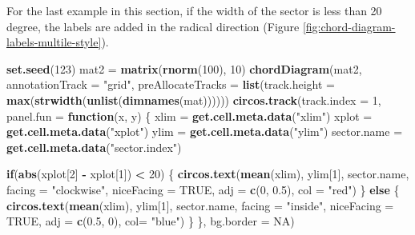 \documentclass[]{book}
\newenvironment{Shaded}{\begin{snugshade}}{\end{snugshade}}
\newcommand{\KeywordTok}[1]{\textcolor[rgb]{0.13,0.29,0.53}{\textbf{#1}}}
\newcommand{\DataTypeTok}[1]{\textcolor[rgb]{0.13,0.29,0.53}{#1}}
\newcommand{\DecValTok}[1]{\textcolor[rgb]{0.00,0.00,0.81}{#1}}
\newcommand{\FloatTok}[1]{\textcolor[rgb]{0.00,0.00,0.81}{#1}}
\newcommand{\StringTok}[1]{\textcolor[rgb]{0.31,0.60,0.02}{#1}}
\newcommand{\OtherTok}[1]{\textcolor[rgb]{0.56,0.35,0.01}{#1}}
\newcommand{\ControlFlowTok}[1]{\textcolor[rgb]{0.13,0.29,0.53}{\textbf{#1}}}
\newcommand{\OperatorTok}[1]{\textcolor[rgb]{0.81,0.36,0.00}{\textbf{#1}}}
\newcommand{\NormalTok}[1]{#1}
\theoremstyle{definition}
\theoremstyle{definition}
\theoremstyle{remark}
\begin{document}
For the last example in this section, if the width of the sector is less
than 20 degree, the labels are added in the radical direction (Figure
\ref{fig:chord-diagram-labels-multile-style}).

\begin{Shaded}
\begin{Highlighting}[]
\KeywordTok{set.seed}\NormalTok{(}\DecValTok{123}\NormalTok{)}
\NormalTok{mat2 =}\StringTok{ }\KeywordTok{matrix}\NormalTok{(}\KeywordTok{rnorm}\NormalTok{(}\DecValTok{100}\NormalTok{), }\DecValTok{10}\NormalTok{)}
\KeywordTok{chordDiagram}\NormalTok{(mat2, }\DataTypeTok{annotationTrack =} \StringTok{"grid"}\NormalTok{, }
    \DataTypeTok{preAllocateTracks =} \KeywordTok{list}\NormalTok{(}\DataTypeTok{track.height =} \KeywordTok{max}\NormalTok{(}\KeywordTok{strwidth}\NormalTok{(}\KeywordTok{unlist}\NormalTok{(}\KeywordTok{dimnames}\NormalTok{(mat))))))}
\KeywordTok{circos.track}\NormalTok{(}\DataTypeTok{track.index =} \DecValTok{1}\NormalTok{, }\DataTypeTok{panel.fun =} \ControlFlowTok{function}\NormalTok{(x, y) \{}
\NormalTok{    xlim =}\StringTok{ }\KeywordTok{get.cell.meta.data}\NormalTok{(}\StringTok{"xlim"}\NormalTok{)}
\NormalTok{    xplot =}\StringTok{ }\KeywordTok{get.cell.meta.data}\NormalTok{(}\StringTok{"xplot"}\NormalTok{)}
\NormalTok{    ylim =}\StringTok{ }\KeywordTok{get.cell.meta.data}\NormalTok{(}\StringTok{"ylim"}\NormalTok{)}
\NormalTok{    sector.name =}\StringTok{ }\KeywordTok{get.cell.meta.data}\NormalTok{(}\StringTok{"sector.index"}\NormalTok{)}

    \ControlFlowTok{if}\NormalTok{(}\KeywordTok{abs}\NormalTok{(xplot[}\DecValTok{2}\NormalTok{] }\OperatorTok{-}\StringTok{ }\NormalTok{xplot[}\DecValTok{1}\NormalTok{]) }\OperatorTok{<}\StringTok{ }\DecValTok{20}\NormalTok{) \{}
        \KeywordTok{circos.text}\NormalTok{(}\KeywordTok{mean}\NormalTok{(xlim), ylim[}\DecValTok{1}\NormalTok{], sector.name, }\DataTypeTok{facing =} \StringTok{"clockwise"}\NormalTok{,}
            \DataTypeTok{niceFacing =} \OtherTok{TRUE}\NormalTok{, }\DataTypeTok{adj =} \KeywordTok{c}\NormalTok{(}\DecValTok{0}\NormalTok{, }\FloatTok{0.5}\NormalTok{), }\DataTypeTok{col =} \StringTok{"red"}\NormalTok{)}
\NormalTok{    \} }\ControlFlowTok{else}\NormalTok{ \{}
        \KeywordTok{circos.text}\NormalTok{(}\KeywordTok{mean}\NormalTok{(xlim), ylim[}\DecValTok{1}\NormalTok{], sector.name, }\DataTypeTok{facing =} \StringTok{"inside"}\NormalTok{, }
            \DataTypeTok{niceFacing =} \OtherTok{TRUE}\NormalTok{, }\DataTypeTok{adj =} \KeywordTok{c}\NormalTok{(}\FloatTok{0.5}\NormalTok{, }\DecValTok{0}\NormalTok{), }\DataTypeTok{col=} \StringTok{"blue"}\NormalTok{)}
\NormalTok{    \}}
\NormalTok{\}, }\DataTypeTok{bg.border =} \OtherTok{NA}\NormalTok{)}
\end{Highlighting}
\end{Shaded}
\end{document}
